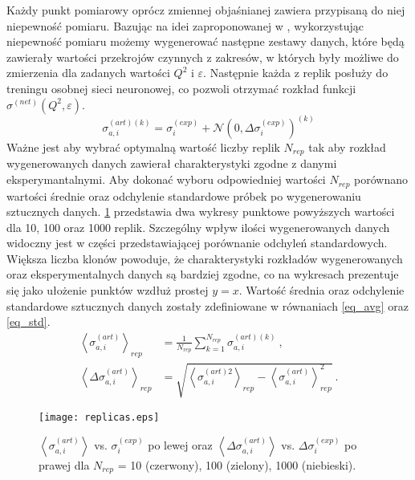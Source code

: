 \documentclass[11pt]{book}
\theoremstyle{definition}
\begin{document}
Każdy punkt pomiarowy oprócz zmiennej objaśnianej zawiera przypisaną do niej niepewność pomiaru. Bazując na idei zaproponowanej w \cite{2002JHEP...05..062F}, wykorzystując niepewność pomiaru możemy wygenerować następne zestawy danych, które będą zawierały wartości przekrojów czynnych z zakresów, w których były możliwe do zmierzenia dla zadanych wartości $Q^2$ i $\varepsilon$. Następnie każda z replik posłuży do treningu osobnej sieci neuronowej, co pozwoli otrzymać rozkład funkcji $\sigma^{(net)}(Q^2,\varepsilon)$. 
%
\begin{equation}
\sigma^{(art)(k)}_{a,i} = \sigma_i^{(exp)} + \mathcal{N}\left( 0, \Delta \sigma_i^{(exp)} \right)^{(k)}
\end{equation} 
%
Ważne jest aby wybrać optymalną wartość liczby replik $N_{rep}$ tak aby rozkład wygenerowanych danych zawierał charakterystyki zgodne z danymi eksperymantalnymi. Aby dokonać wyboru odpowiedniej wartości $N_{rep}$ porównano wartości średnie oraz odchylenie standardowe próbek po wygenerowaniu sztucznych danych. \figurename{} \ref{fig:repliki} przedstawia dwa wykresy punktowe powyższych wartości dla 10, 100 oraz 1000 replik. Szczególny wpływ ilości wygenerowanych danych widoczny jest w części przedstawiającej porównanie odchyleń standardowych. Większa liczba klonów powoduje, że charakterystyki rozkładów wygenerowanych oraz eksperymentalnych danych są bardziej zgodne, co na wykresach prezentuje się jako ułożenie punktów wzdłuż prostej $y=x$. Wartość średnia oraz odchylenie standardowe sztucznych danych zostały zdefiniowane w równaniach \ref{eq_avg} oraz \ref{eq_std}.
%
\begin{subequations}
	\begin{align}
	\left \langle \sigma_{a,i}^{(art)} \right \rangle_{rep} &= \frac{1}{N_{rep}} \sum_{k=1}^{N_{rep}} \sigma_{a,i}^{(art)(k)}~,
	\label{eq_avg} \\
	\left \langle \Delta \sigma_{a,i}^{(art)} \right \rangle_{rep} &= \sqrt{\left \langle \sigma_{a,i}^{(art)2} \right\rangle_{rep} - \left\langle \sigma_{a,i}^{(art)} \right\rangle^2_{rep} }~.
	\label{eq_std}
	\end{align}
\end{subequations}
%
\begin{figure}[htp!]
	\centering
	\texttt{[image: replicas.eps]}
	\caption{$\left \langle \sigma_{a,i}^{(art)} \right\rangle$ vs. $\sigma_i^{(exp)}$ po lewej oraz $\left \langle \Delta \sigma_{a,i}^{(art)} \right \rangle$ vs. $\Delta \sigma_i^{(exp)}$ po prawej dla $N_{rep}$ = 10 (czerwony), 100 (zielony), 1000 (niebieski).} 
	\label{fig:repliki}
\end{figure}
\end{document}
